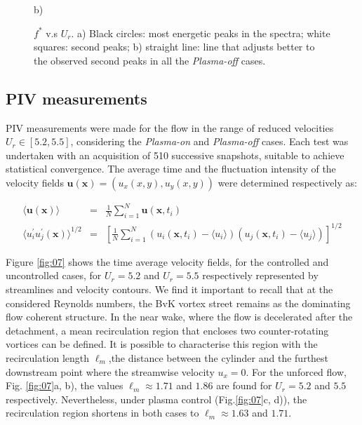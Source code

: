 \documentclass[review]{elsarticle}
\begin{document}
\begin{figure}[h]
\begin{center}
\begin{minipage}[c]{\textwidth}
\begin{minipage}[r]{0.5\textwidth}
{\footnotesize b)}
\end{minipage}
\caption{$f^*$ v.s $U_{r}$. 
a) Black circles: most energetic peaks in the spectra; white squares: second peaks; b) straight line: line that adjusts better to the observed second peaks in all the {\it Plasma-off} cases.}
\label{fig:06}
\end{minipage}
\end{center}
\end{figure}

\subsection*{PIV measurements}

PIV measurements were made for the flow in the range of reduced velocities  $U_r\in[5.2,5.5]$, considering the {\it Plasma-on} and {\it Plasma-off} cases. Each test was undertaken with an acquisition of 510 successive snapshots, suitable to achieve statistical convergence. The average time and the fluctuation intensity of the  velocity fields $\mathbf{u}(\mathbf{x})=(u_x(x,y),u_y(x,y))$ were determined respectively as:

\begin{eqnarray}
\langle\mathbf{u}(\mathbf{x})\rangle &= &\frac{1}{N}\sum_{i=1}^N \mathbf{u}(\mathbf{x},t_i) \\
\langle {u_i^{\prime}u_j^\prime}(\mathbf x)\rangle^{1/2} &=& \left[\frac{1}{N}\sum_{i=1}^N
\left(u_i(\mathbf{x},t_i)-\langle {u_i}\rangle\right)\left(u_j(\mathbf{x},t_i)-\langle {u_j}\rangle\right)\right]^{1/2}
\label{fluct_eq}
\end{eqnarray}

Figure \ref{fig:07} shows the time average velocity fields, for the controlled and uncontrolled cases, for $U_{r} = 5.2$ and  $U_{r} = 5.5$ respectively represented by streamlines and velocity contours. We find it important to recall that at the considered  Reynolds numbers, the BvK vortex street remains as the dominating flow coherent structure. In the near wake, where the flow is decelerated after the detachment, a mean recirculation region that encloses  two counter-rotating vortices can be defined. It is possible to characterise this  region with the recirculation length $\ell_m$,the distance between the cylinder and the furthest downstream point where the streamwise velocity $u_x=0$. For the unforced flow, Fig. \ref{fig:07}a, b), the values $\ell_m \approx 1.71 $ and $1.86$ are found for $U_{r}=5.2$ and $5.5$ respectively. Nevertheless, under plasma control (Fig.\ref{fig:07}c, d)), the recirculation region shortens in both cases to $\ell_m \approx 1.63$ and $1.71$. 
\end{document}
